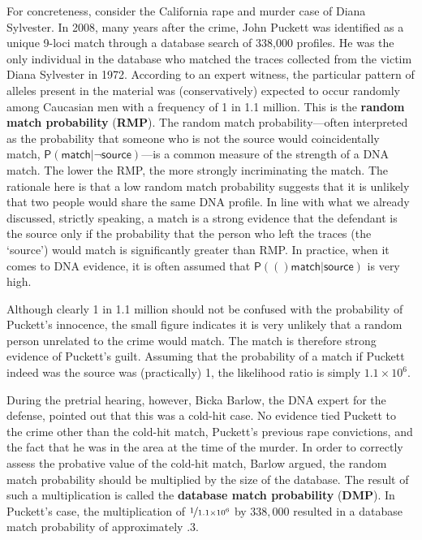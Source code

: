 \documentclass[
  10pt,
  dvipsnames,enabledeprecatedfontcommands]{scrartcl}
\newcommand{\pr}[1]{\mathsf{P}(#1)}
\begin{document}
For concreteness, consider the California rape and murder case of Diana
Sylvester. In 2008, many years after the crime, John Puckett was
identified as a unique 9-loci match through a database search of 338,000
profiles. He was the only individual in the database who matched the
traces collected from the victim Diana Sylvester in 1972. According to
an expert witness, the particular pattern of alleles present in the
material was (conservatively) expected to occur randomly among Caucasian
men with a frequency of 1 in 1.1 million. This is the
\textbf{random match probability} (\textbf{RMP}). The random match
probability---often interpreted as the probability that someone who is
not the source would coincidentally match,
\(\pr{\textsf{match} \vert \neg \textsf{source}}\)---is a common measure
of the strength of a DNA match. The lower the RMP, the more strongly
incriminating the match. The rationale here is that a low random match
probability suggests that it is unlikely that two people would share the
same DNA profile. In line with what we already discussed, strictly
speaking, a match is a strong evidence that the defendant is the source
only if the probability that the person who left the traces (the
`source') would match is significantly greater than RMP. In practice,
when it comes to DNA evidence, it is often assumed that
\(\pr(\textsf{match} \vert \textsf{source})\) is very high.

Although clearly 1 in 1.1 million should not be confused with the
probability of Puckett's innocence, the small figure indicates it is
very unlikely that a random person unrelated to the crime would match.
The match is therefore strong evidence of Puckett's guilt. Assuming that
the probability of a match if Puckett indeed was the source was
(practically) 1, the likelihood ratio is simply \(1.1 \times 10^6\).

During the pretrial hearing, however, Bicka Barlow, the DNA expert for
the defense, pointed out that this was a cold-hit case. No evidence tied
Puckett to the crime other than the cold-hit match, Puckett's previous
rape convictions, and the fact that he was in the area at the time of
the murder. In order to correctly assess the probative value of the
cold-hit match, Barlow argued, the random match probability should be
multiplied by the size of the database. The result of such a
multiplication is called the \textbf{database match probability}
(\textbf{DMP}). In Puckett's case, the multiplication of
\(\nicefrac{1}{1.1\times 10^6}\) by \(338,000\) resulted in a database
match probability of approximately .3.
\end{document}

